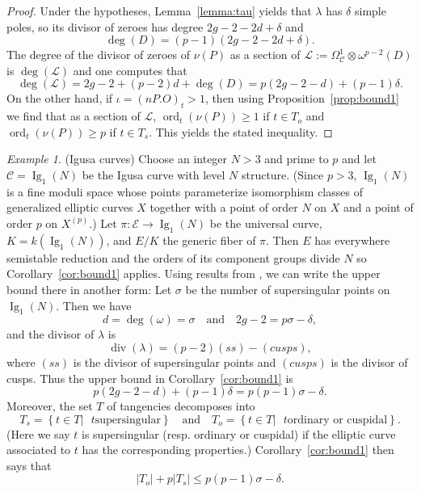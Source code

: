 \documentclass[12pt,reqno]{amsart}
\numberwithin{equation}{section}
\theoremstyle{plain}
\theoremstyle{definition}
\theoremstyle{remark}
\newtheorem{s-example}[subsection]{Example}
\newcommand{\CC}{\mathcal{C}}
\newcommand{\EE}{\mathcal{E}}
\newcommand{\LL}{\mathcal{L}}
\newcommand{\<}{\langle}
\renewcommand{\>}{\rangle}
\newcommand{\tensor}{\otimes}
\DeclareMathOperator{\ord}{ord}
\DeclareMathOperator{\dvsr}{div}
\numberwithin{equation}{section}
\DeclareMathOperator{\Ig}{Ig}
\renewcommand{\and}{\quad\text{and}\quad}
\begin{document}
  \begin{proof}
    Under the hypotheses, Lemma~\ref{lemma:tau} yields that $\lambda$ has
    $\delta$ simple poles, so its divisor of zeroes has degree
    $2g-2-2d+\delta$ and 
\[\deg(D)=(p-1)(2g-2-2d+\delta).\]
    The degree of the divisor of zeroes of $\nu(P)$ as a section of
    $\LL:=\Omega^1_\CC\tensor\omega^{p-2}(D)$ is $\deg(\LL)$ and one
    computes that
    \[\deg(\LL)=2g-2+(p-2)d+\deg(D)=p(2g-2-d)+(p-1)\delta.\]
    On the other hand, if $\iota=(nP.O)_t>1$, then using
    Proposition~\ref{prop:bound1} we find that as a section of $\LL$,
    $\ord_t(\nu(P))\ge1$ if $t\in T_o$ and $\ord_t(\nu(P))\ge p$ if
    $t\in T_s$.  This yields the stated inequality.
  \end{proof}

  
  \begin{s-example} (Igusa curves) Choose an integer $N>3$ and prime
    to $p$ and let $\CC=\Ig_1(N)$ be the Igusa curve with level $N$
    structure.  (Since $p>3$, $\Ig_1(N)$ is a fine moduli space whose
    points parameterize isomorphism classes of generalized elliptic
    curves $X$ together with a point of order $N$ on $X$ and a point
    of order $p$ on $X^{(p)}$.)  Let $\pi:\EE\to\Ig_1(N)$ be the
    universal curve, $K=k(\Ig_1(N))$, and $E/K$ the generic fiber of
    $\pi$.  Then $E$ has everywhere semistable reduction and the
    orders of its component groups divide $N$ so
    Corollary~\ref{cor:bound1} applies.  Using results from
    \cite{Ulmer91}, we can write the upper bound there in another
    form: Let $\sigma$ be the number of supersingular points on
    $\Ig_1(N)$.  Then we have
    \[d=\deg(\omega)=\sigma
      \and
      2g-2=p\sigma-\delta,\]
    and the divisor of $\lambda$ is
    \[\dvsr(\lambda)=(p-2)(ss)-(cusps),\]
    where $(ss)$ is the divisor of supersingular points and $(cusps)$
    is the divisor of cusps.
    Thus the upper bound in Corollary~\ref{cor:bound1} is
\[p(2g-2-d)+(p-1)\delta= p(p-1)\sigma-\delta.\]
    Moreover, the set $T$ of tangencies decomposes into
   \[T_s=\left\{t\in T\left.\mid\text{ $t$
           supersingular}\right.\right\}
     \and
    T_o=\left\{t\in T\left.\mid\text{ $t$
           ordinary or cuspidal}\right.\right\}.
     \]
 (Here we say $t$ is supersingular (resp. ordinary or cuspidal) if the
 elliptic curve associated to $t$ has the corresponding properties.)
 Corollary~\ref{cor:bound1} then says that
 \[|T_o|+p|T_s|\le p(p-1)\sigma-\delta.\]
  \end{s-example}
\end{document}
